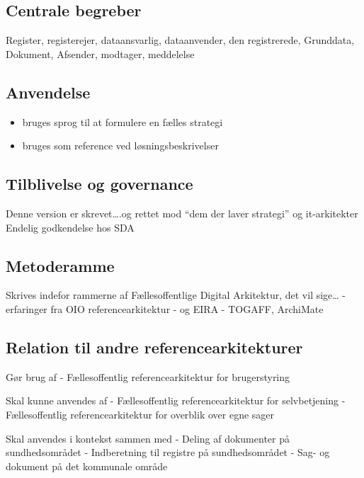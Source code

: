 \subsection{Centrale begreber}\label{centrale-begreber}

Register, registerejer, dataansvarlig, dataanvender, den registrerede,
Grunddata, Dokument, Afsender, modtager, meddelelse

\subsection{Anvendelse}\label{anvendelse}

\begin{itemize}
\tightlist
\item
  bruges sprog til at formulere en fælles strategi
\item
  bruges som reference ved løsningsbeskrivelser
\end{itemize}

\subsection{Tilblivelse og governance}\label{tilblivelse-og-governance}

Denne version er skrevet\ldots{}.og rettet mod ``dem der laver
strategi'' og it-arkitekter Endelig godkendelse hos SDA

\subsection{Metoderamme}\label{metoderamme}

Skrives indefor rammerne af Fællesoffentlige Digital Arkitektur, det vil
sige\ldots{} - erfaringer fra OIO referencearkitektur - og EIRA -
TOGAFF, ArchiMate

\subsection{Relation til andre
referencearkitekturer}\label{relation-til-andre-referencearkitekturer}

Gør brug af - Fællesoffentlig referencearkitektur for brugerstyring

Skal kunne anvendes af - Fællesoffentlig referencearkitektur for
selvbetjening - Fællesoffentlig referencearkitektur for overblik over
egne sager

Skal anvendes i kontekst sammen med - Deling af dokumenter på
sundhedsområdet - Indberetning til registre på sundhedsområdet - Sag- og
dokument på det kommunale område


